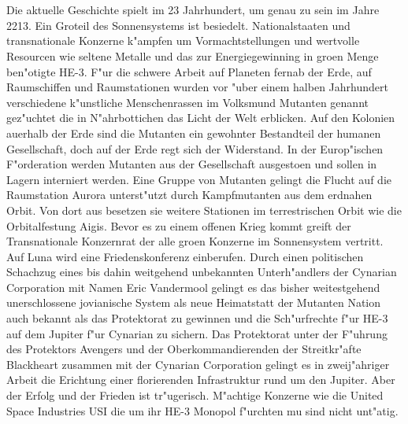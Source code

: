 \section{\@introchaptername}

Die aktuelle Geschichte spielt im 23 Jahrhundert, um genau zu sein im Jahre 2213. Ein Gro\3teil des Sonnensystems ist besiedelt. Nationalstaaten und transnationale Konzerne k"ampfen um Vormachtstellungen und wertvolle Resourcen wie seltene Metalle und das zur Energiegewinning in gro\3en Menge ben"otigte HE-3. F"ur die schwere Arbeit auf Planeten fernab der Erde, auf Raumschiffen und Raumstationen wurden vor "uber einem halben Jahrhundert verschiedene k"unstliche Menschenrassen im Volksmund Mutanten genannt gez"uchtet die in N"ahrbottichen das Licht der Welt erblicken. Auf den Kolonien au\3erhalb der Erde sind die Mutanten ein gewohnter Bestandteil der humanen Gesellschaft, doch auf der Erde regt sich der Widerstand. In der Europ"ischen F"orderation werden Mutanten aus der Gesellschaft ausgesto\3en und sollen in Lagern interniert werden. Eine Gruppe von Mutanten gelingt die Flucht auf die Raumstation Aurora unterst"utzt durch Kampfmutanten aus dem erdnahen Orbit. Von dort aus besetzen sie weitere Stationen im terrestrischen Orbit wie die Orbitalfestung Aigis. Bevor es zu einem offenen Krieg kommt greift der Transnationale Konzernrat der alle gro\3en Konzerne im Sonnensystem vertritt. Auf Luna wird eine Friedenskonferenz einberufen. Durch einen politischen Schachzug eines bis dahin weitgehend unbekannten Unterh"andlers der Cynarian Corporation mit Namen Eric Vandermool gelingt es das bisher weitestgehend unerschlossene jovianische System als neue Heimatstatt der Mutanten Nation auch bekannt als das  Protektorat zu gewinnen und die Sch"urfrechte f"ur HE-3 auf dem Jupiter f"ur Cynarian zu sichern. Das Protektorat unter der F"uhrung des Protektors Avengers und der Oberkommandierenden der Streitkr"afte Blackheart zusammen mit der Cynarian Corporation gelingt es in zweij"ahriger Arbeit die Erichtung einer florierenden Infrastruktur rund um den Jupiter. Aber der Erfolg und der Frieden ist tr"ugerisch. M"achtige Konzerne wie die United Space Industries USI die um ihr HE-3 Monopol f"urchten mu\3 sind nicht unt"atig.